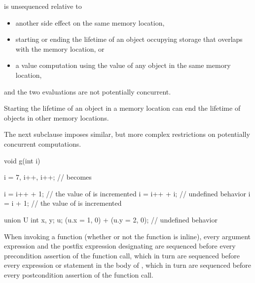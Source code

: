 is unsequenced relative to
\begin{itemize}
\item
another side effect on the same memory location,
\item
starting or ending the lifetime of an object occupying storage that
overlaps with the memory location, or
\item
a value computation using the value of any object in the same memory location,
\end{itemize}
and the two evaluations are not potentially concurrent.
\begin{note}
Starting the lifetime of an object in a memory location can end the lifetime of
objects in other memory locations.
\end{note}
\begin{note}
The next subclause imposes similar, but more complex restrictions on
potentially concurrent computations.
\end{note}

\begin{example}
\begin{codeblock}
void g(int i) {
  i = 7, i++, i++;              //  becomes 

  i = i++ + 1;                  // the value of  is incremented
  i = i++ + i;                  // undefined behavior
  i = i + 1;                    // the value of  is incremented

  union U { int x, y; } u;
  (u.x = 1, 0) + (u.y = 2, 0);  // undefined behavior
}
\end{codeblock}
\end{example}

\pnum
When invoking a function  (whether or not the function is inline),
every argument expression and
the postfix expression designating 
are sequenced before
every precondition assertion of the function call,
which in turn are sequenced before
every expression or statement
in the body of ,
which in turn are sequenced before
every postcondition assertion of the function call.

